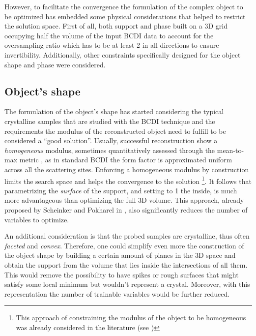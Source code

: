 However, to facilitate the convergence the formulation of the complex object to be optimized has embedded some physical considerations that 
helped to restrict the solution space. First of all, both support and phase built on a 3D grid occupying half the volume of the 
input BCDI data to account for the oversampling ratio which has to be at least 2 in all directions to ensure invertibility.  
Additionally, other constraints specifically designed for the object shape and phase were considered. 

\subsection{Object's shape}

The formulation of the object's shape has started considering the typical crystalline samples that are studied with the BCDI technique
and the requirements the modulus of the reconstructed object need to fulfill to be considered a ``good solution''. 
Usually, successful reconstruction show a \textit{homogeneous} modulus, sometimes quantitatively assessed through the 
mean-to-max metric \cite{Frisch2023CuAgCatalysts, Grimes2024CatalystStrain}, as in standard BCDI the form factor is 
approximated uniform across all the scattering sites. Enforcing a homogeneous modulus by construction limits the search space 
and helps the convergence to the solution \footnote{This approach of constraining the modulus of the object to be homogeneous was already 
considered in the literature (see \cite{Minkevich2007_virginie, Minkevich2008_baumbach, madsen2021})}.
It follows that parametrizing the \textit{surface} of the support, and setting to 1 the inside, is much more advantageous than optimizing 
the full 3D volume. This approach, already proposed by Scheinker and Pokharel in \cite{scheinker_adaptive_2020}, 
also significantly reduces the number of variables to optimize.

An additional consideration is that the probed samples are crystalline, thus often \textit{faceted} and \textit{convex}. 
Therefore, one could simplify even more the construction of the object shape by building a certain amount of planes in the 
3D space and obtain the support from the volume that lies inside the intersections of all them. This would remove the possibility 
to have spikes or rough surfaces that might satisfy some local minimum but wouldn't represent a crystal. Moreover, with this 
representation the number of trainable variables would be further reduced. 

